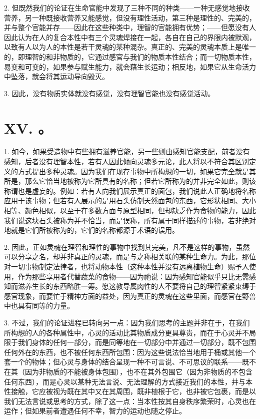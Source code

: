 2. 但既然我们的论证在生命官能中发现了三种不同的种类——一种无感觉地接收营养，另一种既接收营养又能感觉，但没有理性活动，第三种是理性的、完美的，并与整个官能并存——因此在这些种类中，理智的官能拥有优势；——但愿没有人因此认为在人的复合本性中有三个灵魂焊接在一起，各自在自己的界限内被默观，以致有人以为人的本性是若干灵魂的某种混杂。真正的、完美的灵魂本质上是唯一的，即理智的和非物质的，它通过感官与我们的物质本性结合；而一切物质本性，易变和可变的，如果参与赋生能力，就会藉生长运动；相反地，如果它从生命活力中坠落，就会将其运动导向毁灭。\par

3. 因此，没有物质实体就没有感觉，没有理智官能也没有感觉活动。\par


\section{XV. 。}

1. 如今，如果受造物中有些拥有滋养官能，另一些则由感知官能支配，前者没有感知，后者没有理智本性，若有人因此倾向灵魂多元论，此人将以不符合其区别定义的方式提出多种灵魂。因为我们在现存事物中所构想的一切，如果它完全就是其所是，那么它恰当地被称为它所具有的名称；但若它所称为的并非完全如此，则该称谓也是虚妄的。例如：若有人向我们展示真正的面包，我们说此人正确地将名称应用于该事物；但若有人展示的是用石头仿制天然面包的东西，它形状相同、大小相等、颜色相似，以至于在多数方面与原型相同，但却缺乏作为食物的能力，因此我们说这块石头被称为并不恰当，而是误称，所有属于同样描述的事物，若非绝对地就是它们所被称为的，它们的名称都源于术语的误用。\par

2. 因此，正如灵魂在理智和理性的事物中找到其完美，凡不是这样的事物，虽然可以分享之名，却并非真正的灵魂，而是与之称相关联的某种生命力。为此，那位对一切事物制定法律者，也将动物本性（这种本性并没有远离植物生命）赐予人使用，作为那些享用者代替蔬菜的食物——因为祂说：因为感知官能似乎只比无需感知而滋养生长的东西略胜一筹。愿这教导属肉性的人不要将自己的理智紧紧束缚于感官现象，而要忙于精神方面的益处，因为真正的灵魂在这些里面，而感官在野兽中也具有同等的力量。\par

3. 不过，我们的论证进程已转向另一点：因为我们思考的主题并非在于，在我们所构想的人的各种属性中，心灵的活动比其物质成分更具尊贵，而在于心灵并不局限于我们身体的任何一部分，而是同等地在一切部分中并通过一切部分，既不包围任何外在的东西，也不被任何东西所包围：因为这些说法恰当地用于桶或其他一个套一个的物体；但心灵与身体的结合呈现一种不可言说、不可思议的联系——既不在其（因为非物质的不能被身体包围），也不在其外包围它（因为非物质的不包含任何东西），而是心灵以某种无法言说、无法理解的方式接近我们的本性，并与本性接触，它应被视为既在其中又在其周围，既非植根于它，也非被它包裹，而是以我们无法言说或思考的方式，除了这一点：当本性按其自身秩序繁荣时，心灵也在运作；但如果前者遭遇任何不幸，智力的运动也随之停止。\par

